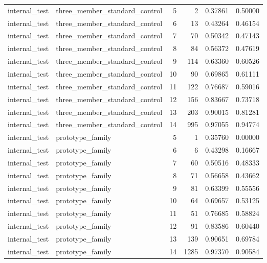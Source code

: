 \begin{tabular}{llrrrr}
internal\_test & three\_member\_standard\_control & 5 & 2 & 0.37861 & 0.50000 \\
internal\_test & three\_member\_standard\_control & 6 & 13 & 0.43264 & 0.46154 \\
internal\_test & three\_member\_standard\_control & 7 & 70 & 0.50342 & 0.47143 \\
internal\_test & three\_member\_standard\_control & 8 & 84 & 0.56372 & 0.47619 \\
internal\_test & three\_member\_standard\_control & 9 & 114 & 0.63360 & 0.60526 \\
internal\_test & three\_member\_standard\_control & 10 & 90 & 0.69865 & 0.61111 \\
internal\_test & three\_member\_standard\_control & 11 & 122 & 0.76687 & 0.59016 \\
internal\_test & three\_member\_standard\_control & 12 & 156 & 0.83667 & 0.73718 \\
internal\_test & three\_member\_standard\_control & 13 & 203 & 0.90015 & 0.81281 \\
internal\_test & three\_member\_standard\_control & 14 & 995 & 0.97055 & 0.94774 \\
internal\_test & prototype\_family & 5 & 1 & 0.35760 & 0.00000 \\
internal\_test & prototype\_family & 6 & 6 & 0.43298 & 0.16667 \\
internal\_test & prototype\_family & 7 & 60 & 0.50516 & 0.48333 \\
internal\_test & prototype\_family & 8 & 71 & 0.56658 & 0.43662 \\
internal\_test & prototype\_family & 9 & 81 & 0.63399 & 0.55556 \\
internal\_test & prototype\_family & 10 & 64 & 0.69657 & 0.53125 \\
internal\_test & prototype\_family & 11 & 51 & 0.76685 & 0.58824 \\
internal\_test & prototype\_family & 12 & 91 & 0.83586 & 0.60440 \\
internal\_test & prototype\_family & 13 & 139 & 0.90651 & 0.69784 \\
internal\_test & prototype\_family & 14 & 1285 & 0.97370 & 0.90584 \\
\bottomrule
\end{tabular}
